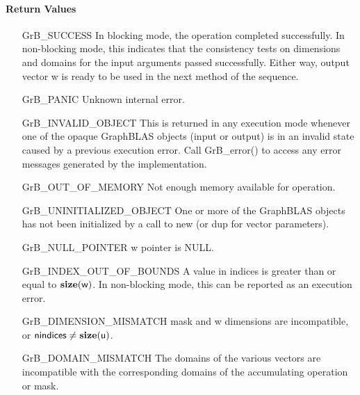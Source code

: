 \paragraph{Return Values}

\begin{itemize}[leftmargin=2.1in]
    \item[{\sf GrB\_SUCCESS}]         In blocking mode, the operation completed
    successfully. In non-blocking mode, this indicates that the consistency 
    tests on dimensions and domains for the input arguments passed successfully. 
    Either way, output vector {\sf w} is ready to be used in the next method of 
    the sequence.

    \item[{\sf GrB\_PANIC}]            Unknown internal error.
    
    \item[{\sf GrB\_INVALID\_OBJECT}] This is returned in any execution mode 
    whenever one of the opaque GraphBLAS objects (input or output) is in an invalid 
    state caused by a previous execution error.  Call {GrB\_error()} to access 
    any error messages generated by the implementation.

    \item[{\sf GrB\_OUT\_OF\_MEMORY}]  Not enough memory available for operation.
    
    \item[{\sf GrB\_UNINITIALIZED\_OBJECT}] One or more of the GraphBLAS objects
    has not been initialized by a call to {\sf new} (or {\sf dup} for vector
    parameters).
    
    \item[{\sf GrB\_NULL\_POINTER}]  {\sf w} pointer is {\sf NULL}.

    \item[{\sf GrB\_INDEX\_OUT\_OF\_BOUNDS}]  A value in {\sf indices} is greater
    than or equal to $\bold{size}({\sf w})$.  In non-blocking mode, this can be
    reported as an execution error.
    
    \item[{\sf GrB\_DIMENSION\_MISMATCH}] {\sf mask} and {\sf w} dimensions are
    incompatible, or ${\sf nindices} \neq \bold{size}({\sf u})$. 
    
    
    \item[{\sf GrB\_DOMAIN\_MISMATCH}]    The domains of the various vectors are
	incompatible with the corresponding domains of the accumulating operation or 
    mask.
\end{itemize}

